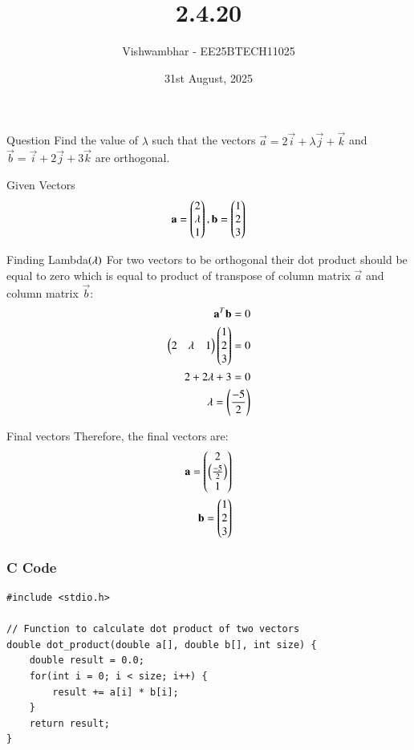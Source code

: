 \documentclass{beamer}
\title{2.4.20}
\date{31st August, 2025}
\author{Vishwambhar - EE25BTECH11025}
\begin{document}
\frame{\titlepage}
\begin{frame}{Question}
Find the value of $\lambda$ such that the vectors $\vec{a}=2\vec{i}+\lambda\vec{j}+\vec{k}$ and $\vec{b}=\vec{i}+2\vec{j}+3\vec{k}$ are orthogonal.
\end{frame}

\begin{frame}{Given Vectors}
\begin{align}
    \mathbf{a}=\begin{pmatrix}2\\\lambda\\1\end{pmatrix},
    \mathbf{b}=\begin{pmatrix}1\\2\\3\end{pmatrix}
\end{align}
\end{frame}

\begin{frame}{Finding Lambda$\left(\lambda\right)$}
For two vectors to be orthogonal their dot product should be equal to zero which is equal to product of transpose of column matrix $\vec{a}$ and column matrix $\vec{b}$:
\begin{align}
    \mathbf{a}^T\mathbf{b}=0\\
    \begin{pmatrix}2&\lambda&1\end{pmatrix}\begin{pmatrix}1\\2\\3\end{pmatrix}=0\\
    2+2\lambda+3=0\\
    \lambda=\left(\frac{-5}{2}\right)
\end{align}
\end{frame}

\begin{frame}{Final vectors}
    Therefore, the final vectors are:
\begin{align}
    \mathbf{a}=\begin{pmatrix}2\\\left(\frac{-5}{2}\right)\\1\end{pmatrix}\\
    \mathbf{b}=\begin{pmatrix}1\\2\\3\end{pmatrix}
\end{align}
\end{frame}

\begin{frame}[fragile]
    \frametitle{C Code}
    \begin{lstlisting}
#include <stdio.h>

// Function to calculate dot product of two vectors
double dot_product(double a[], double b[], int size) {
    double result = 0.0;
    for(int i = 0; i < size; i++) {
        result += a[i] * b[i];
    }
    return result;
}
    \end{lstlisting}
\end{frame}
\end{document}
